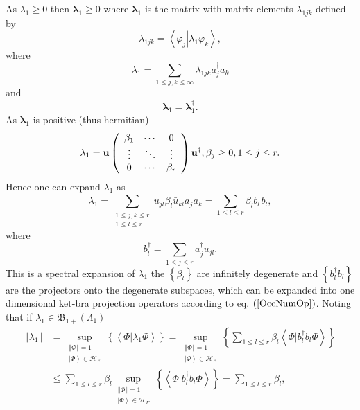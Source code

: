 \documentclass[aps,preprint]{revtex4}%
\begin{document}
As $\lambda_{1}\geq0$ then $\mathbf{\lambda}_{1}\geq0$ where $\mathbf{\lambda
}_{1}$ is the matrix with matrix elements $\lambda_{1jk}$ defined by
\begin{equation}
\lambda_{1jk}=\left\langle \left.  \varphi_{j}\right\vert \lambda_{1}%
\varphi_{k}\right\rangle ,
\end{equation}
where
\begin{equation}
\lambda_{1}=\sum_{1\leq j,k\leq\infty}\lambda_{1jk}a_{j}^{\dagger}a_{k}%
\end{equation}
and
\begin{equation}
\mathbf{\lambda}_{1}=\mathbf{\lambda}_{1}^{\dagger}.
\end{equation}
As $\mathbf{\lambda}_{1}$ is positive (thus hermitian)
\begin{equation}
\mathbf{\lambda}_{1}=\mathbf{u}\left(
\begin{array}
[c]{ccc}%
\beta_{1} & \cdots & 0\\
\vdots & \ddots & \vdots\\
0 & \cdots & \beta_{r}%
\end{array}
\right)  \mathbf{u}^{\dagger};\beta_{j}\geq0,1\leq j\leq r.
\end{equation}
Hence one can expand $\lambda_{1}$ as
\begin{equation}
\lambda_{1}=\sum_{\substack{1\leq j,k\leq r\\1\leq l\leq r}}u_{jl}\beta
_{l}\bar{u}_{kl}a_{j}^{\dagger}a_{k}=\sum_{1\leq l\leq r}\beta_{l}%
b_{l}^{\dagger}b_{l},
\end{equation}
where%
\begin{equation}
b_{l}^{\dagger}=\sum_{1\leq j\leq r}a_{j}^{\dagger}u_{jl}.
\end{equation}
This is a spectral expansion of $\lambda_{1}$ the $\left\{  \beta_{l}\right\}
$ are infinitely degenerate and $\left\{  b_{l}^{\dagger}b_{l}\right\}  $ are
the projectors onto the degenerate subspaces, which can be expanded into one
dimensional ket-bra projection operators according to eq. $\left(
\ref{OccNumOp}\right)  $. Noting that if $\lambda_{1}\in\mathfrak{B}%
_{1+}\left(  \Lambda_{1}\right)  $
\begin{align}
\left\Vert \lambda_{1}\right\Vert  &  =\sup_{\substack{\left\Vert
\Phi\right\Vert =1\\\left\vert \Phi\right\rangle \in\mathcal{H}_{F}}}\left\{
\left\langle \left.  \Phi\right\vert \lambda_{1}\Phi\right\rangle \right\}
=\sup_{\substack{\left\Vert \Phi\right\Vert =1\\\left\vert \Phi\right\rangle
\in\mathcal{H}_{F}}}\left\{  \sum_{1\leq l\leq r}\beta_{l}\left\langle \left.
\Phi\right\vert b_{l}^{\dagger}b_{l}\Phi\right\rangle \right\} \\
&  \leq\sum_{1\leq l\leq r}\beta_{l}\sup_{\substack{\left\Vert \Phi\right\Vert
=1\\\left\vert \Phi\right\rangle \in\mathcal{H}_{F}}}\left\{  \left\langle
\left.  \Phi\right\vert b_{l}^{\dagger}b_{l}\Phi\right\rangle \right\}
=\sum_{1\leq l\leq r}\beta_{l},
\end{align}
\end{document}
